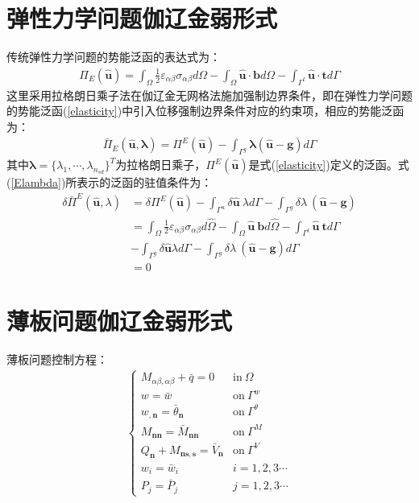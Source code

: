 \section{弹性力学问题伽辽金弱形式}
传统弹性力学问题的势能泛函的表达式为：
\begin{equation}\label{elasticity}
\begin{split}
    \Pi_E(\hat{\pmb{u}})=\int_{\Omega}\frac{1}{2}\varepsilon_{\alpha\beta}\sigma_{\alpha\beta}d\Omega-\int_{\Omega}\hat{\pmb{u}}\cdot\pmb{b}d\Omega-\int_{\Gamma^t}\hat{\pmb{u}}\cdot\pmb{t}d\Gamma
\end{split}
\end{equation}
这里采用拉格朗日乘子法在伽辽金无网格法施加强制边界条件，即在弹性力学问题的势能泛函(\ref{elasticity})中引入位移强制边界条件对应的约束项，相应的势能泛函为：
\begin{equation}\label{Elambda}
\begin{split}
    \bar{\Pi}_E(\hat{\pmb{u}},\pmb{\lambda})=\Pi^E(\hat{\pmb{u}})-\int_{\Gamma^g}\pmb{\lambda}(\hat{\pmb{u}}-\pmb{g})d\Gamma
\end{split}
\end{equation}
其中$\pmb{\lambda}=\{\lambda_1,\dotsb,\lambda_{n_{sd}}\}^T$为拉格朗日乘子，$\Pi^E(\hat{\pmb{u}})$是式(\ref{elasticity})定义的泛函。式(\ref{Elambda})所表示的泛函的驻值条件为：
\begin{equation} 
\begin{split}
    \delta\bar{\Pi}^E(\hat{\pmb{u}},\lambda)&=\delta\Pi^E(\hat{\pmb{u}})-\int_{\Gamma^u}\delta\hat{\pmb{u}}~\lambda d\Gamma-\int_{\Gamma^g}\delta\lambda~(\hat{\pmb{u}}-\pmb{g})\\
    &=\int_{\Omega}\frac{1}{2}\varepsilon_{\alpha\beta}\sigma_{\alpha\beta}d\hat{\Omega}-\int_{\Omega}\hat{\pmb{u}}~\pmb{b}d\hat{\Omega}-\int_{\Gamma^t}\hat{\pmb{u}}~\pmb{t}d\Gamma\\
    &-\int_{\Gamma^g}\delta\hat{\pmb{u}}\lambda d\Gamma-\int_{\Gamma^g}\delta\lambda~(\hat{\pmb{u}}-\pmb{g})d\Gamma\\
    &=0
\end{split}
\end{equation}
\section{薄板问题伽辽金弱形式}
薄板问题控制方程：
\begin{equation}
\begin{split}
\begin{cases}
    M_{\alpha\beta,\alpha\beta}+\bar q=0  &\text{in}~\Omega\\
    w=\bar{w} &\text{on}~\Gamma^w\\
    w_{,\pmb{n}}=\bar \theta_{\pmb{n}}&\text{on}~\Gamma^{\theta}\\
    M_{\pmb{nn}}=\bar M_{\pmb{nn}}&\text{on}~\Gamma^M\\
    Q_{\pmb{n}}+M_{\pmb{ns,s}}=\bar V_{\pmb{n}}&\text{on}~\Gamma^V\\
    w_i=\bar{w}_i&i=1,2,3\cdots\\
    P_j=\bar P_j&j=1,2,3\cdots
\end{cases}
\end{split}
\end{equation}

